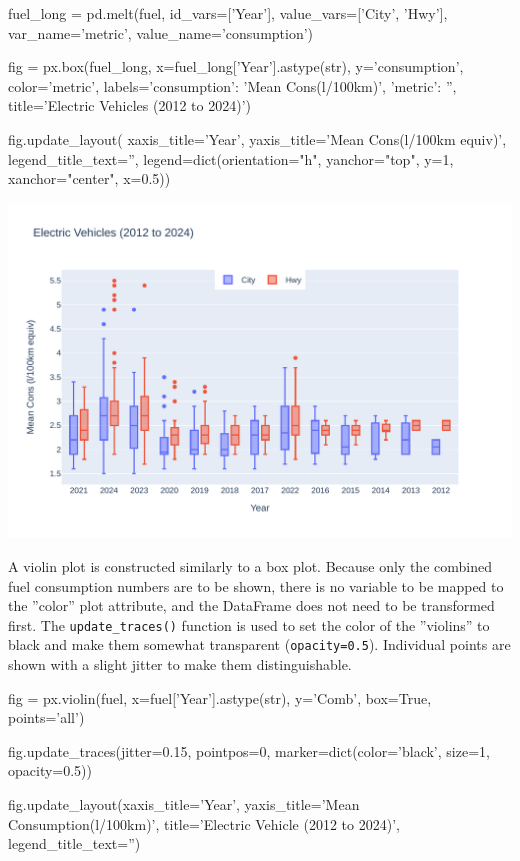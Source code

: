 \begin{samepage}
\begin{pythoncode}
fuel_long = pd.melt(fuel, 
    id_vars=['Year'], value_vars=['City', 'Hwy'], 
    var_name='metric', value_name='consumption')

fig = px.box(fuel_long, 
         x=fuel_long['Year'].astype(str), 
         y='consumption', color='metric', 
         labels={'consumption': 'Mean Cons\n(l/100km)', 'metric': ''},
         title='Electric Vehicles (2012 to 2024)')

fig.update_layout(
         xaxis_title='Year', 
         yaxis_title='Mean Cons\n(l/100km equiv)',
         legend_title_text='', 
         legend=dict(orientation="h", 
                     yanchor="top", y=1, 
                     xanchor="center", x=0.5))
\end{pythoncode}
\end{samepage}

\begin{center}
  \includegraphics[width=.8\textwidth]{px.fuel.box.pdf}
\end{center}

A violin plot is constructed similarly to a box plot. Because only the combined fuel consumption numbers are to be shown, there is no variable to be mapped to the ''color'' plot attribute, and the DataFrame does not need to be transformed first. The \texttt{update\_traces()} function is used to set the color of the ''violins'' to black and make them somewhat transparent (\texttt{opacity=0.5}). Individual points are shown with a slight jitter to make them distinguishable.

\begin{samepage}
\begin{pythoncode}
fig = px.violin(fuel, 
       x=fuel['Year'].astype(str), 
       y='Comb', box=True, 
       points='all')

fig.update_traces(jitter=0.15, pointpos=0, 
       marker=dict(color='black', size=1, opacity=0.5))

fig.update_layout(xaxis_title='Year',
       yaxis_title='Mean Consumption\n(l/100km)',
       title='Electric Vehicle (2012 to 2024)',
       legend_title_text='')
\end{pythoncode}
\end{samepage}


